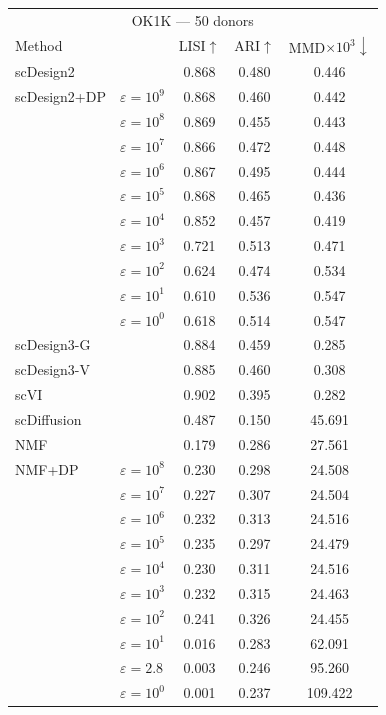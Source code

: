 \begin{tabular}{llccc}
\toprule
\multicolumn{5}{c}{OK1K — 50 donors} \\
Method & & LISI$\uparrow$ & ARI$\uparrow$ & MMD$\times 10^3\downarrow$ \\
\midrule
scDesign2 &  & 0.868 & 0.480 & 0.446 \\
scDesign2+DP & $\varepsilon=10^{9}$ & 0.868 & 0.460 & 0.442 \\
 & $\varepsilon=10^{8}$ & 0.869 & 0.455 & 0.443 \\
 & $\varepsilon=10^{7}$ & 0.866 & 0.472 & 0.448 \\
 & $\varepsilon=10^{6}$ & 0.867 & 0.495 & 0.444 \\
 & $\varepsilon=10^{5}$ & 0.868 & 0.465 & 0.436 \\
 & $\varepsilon=10^{4}$ & 0.852 & 0.457 & 0.419 \\
 & $\varepsilon=10^{3}$ & 0.721 & 0.513 & 0.471 \\
 & $\varepsilon=10^{2}$ & 0.624 & 0.474 & 0.534 \\
 & $\varepsilon=10^{1}$ & 0.610 & 0.536 & 0.547 \\
 & $\varepsilon=10^{0}$ & 0.618 & 0.514 & 0.547 \\
\addlinespace[2pt]
scDesign3-G &  & 0.884 & 0.459 & 0.285 \\
\addlinespace[2pt]
scDesign3-V &  & 0.885 & 0.460 & 0.308 \\
\addlinespace[2pt]
scVI &  & 0.902 & 0.395 & 0.282 \\
\addlinespace[2pt]
scDiffusion &  & 0.487 & 0.150 & 45.691 \\
\addlinespace[2pt]
NMF &  & 0.179 & 0.286 & 27.561 \\
\addlinespace[2pt]
NMF+DP & $\varepsilon=10^{8}$ & 0.230 & 0.298 & 24.508 \\
 & $\varepsilon=10^{7}$ & 0.227 & 0.307 & 24.504 \\
 & $\varepsilon=10^{6}$ & 0.232 & 0.313 & 24.516 \\
 & $\varepsilon=10^{5}$ & 0.235 & 0.297 & 24.479 \\
 & $\varepsilon=10^{4}$ & 0.230 & 0.311 & 24.516 \\
 & $\varepsilon=10^{3}$ & 0.232 & 0.315 & 24.463 \\
 & $\varepsilon=10^{2}$ & 0.241 & 0.326 & 24.455 \\
 & $\varepsilon=10^{1}$ & 0.016 & 0.283 & 62.091 \\
 & $\varepsilon=2.8$ & 0.003 & 0.246 & 95.260 \\
 & $\varepsilon=10^{0}$ & 0.001 & 0.237 & 109.422 \\
\bottomrule
\end{tabular}

